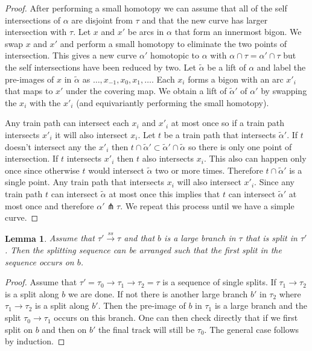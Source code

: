 \documentclass[11pt]{article}
\newtheorem{lemma}[thm]{Lemma}
\theoremstyle{remark}
\def\ss{{\overset{ss}\longrightarrow}}
\begin{document}
\begin{proof}
After performing a small homotopy we can assume that all of the self intersections of $\alpha$ are disjoint from $\tau$ and that the new curve has larger intersection with $\tau$. 
Let $x$ and $x'$ be arcs in $\alpha$ that form an innermost bigon. We swap $x$ and $x'$ and perform a small homotopy to eliminate the two points of intersection. This gives a new curve $\alpha'$ homotopic to $\alpha$  with $\alpha \cap \tau = \alpha' \cap \tau$ but the self intersections have been reduced by two. 
 Let $\tilde\alpha$ be a lift of $\alpha$ and label the pre-images of $x$ in $\tilde\alpha$ as $\dots, x_{-1}, x_0, x_1, \dots$. Each $x_i$ forms a bigon with an arc $x'_i$ that maps to $x'$ under the covering map. We obtain a lift of $\tilde\alpha'$ of $\alpha'$ by swapping the $x_i$ with the $x'_i$ (and equivariantly performing the small homotopy). 

Any train path can intersect each $x_i$ and $x'_i$ at most once so if a train path intersects $x'_i$ it will also intersect $x_i$. Let $t$ be a train path that intersects $\tilde\alpha'$. If $t$ doesn't intersect any the $x'_i$ then $t\cap \tilde\alpha' \subset \tilde\alpha'\cap \tilde\alpha$ so there is only one point of intersection. If $t$ intersects $x'_i$ then $t$ also intersects $x_i$. This also can happen only once since otherwise $t$ would intersect $\tilde\alpha$ two or more times. Therefore $t\cap\tilde\alpha'$ is a single point.
 Any train path that intersects $x_i$ will also intersect $x'_i$. Since any train path $t$ can intersect $\tilde\alpha$ at most once this implies that $t$ can intersect $\tilde\alpha'$ at most once and therefore $\alpha' \pitchfork \tau$. 
 We repeat this process until we have a simple curve.
\end{proof}

\begin{lemma}\label{commute}
Assume that $\tau'\ss\tau$ and that $b$ is a large branch in $\tau$ that is split in $\tau'$. Then the splitting sequence can be arranged such that the first split in the sequence occurs on $b$.
\end{lemma}

\begin{proof}
Assume that $\tau' =\tau_0 \to \tau_1 \to \tau_2 = \tau$ is a sequence of single splits. If $\tau_1\to\tau_2$ is a split along $b$ we are done. If not there is another large branch $b'$ in $\tau_2$ where $\tau_1 \to \tau_2$ is a split along $b'$. Then the pre-image of $b$ in $\tau_1$ is a large branch and the split $\tau_0\to\tau_1$ occurs on this branch. One can then check directly that if we first split on $b$ and then on $b'$ the final track will still be $\tau_0$. The general case follows by induction.
\end{proof}
\end{document}

